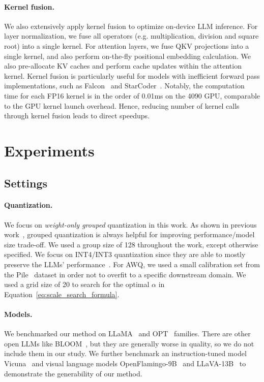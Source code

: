 \paragraph{Kernel fusion.} We also extensively apply kernel fusion to optimize on-device LLM inference. For layer normalization, we fuse all operators (e.g. multiplication, division and square root) into a single kernel. For attention layers, we fuse QKV projections into a single kernel, and also perform on-the-fly positional embedding calculation. We also pre-allocate KV caches and perform cache updates within the attention kernel. Kernel fusion is particularly useful for models with inefficient forward pass implementations, such as Falcon~\cite{penedo2023refinedweb} and StarCoder~\cite{li2023starcoder}. Notably, the computation time for each FP16 kernel is in the order of 0.01ms on the 4090 GPU, comparable to the GPU kernel launch overhead. Hence, reducing number of kernel calls through kernel fusion leads to direct speedups.

\section{Experiments}

\subsection{Settings}

\paragraph{Quantization. } We focus on \emph{weight-only grouped} quantization in this work. As shown in previous work~\cite{dettmers2022case, frantar2022gptq}, grouped quantization is always helpful for improving performance/model size trade-off. We used a group size of 128 throughout the work, except otherwise specified. We focus on INT4/INT3 quantization since they are able to mostly preserve the LLMs' performance~\cite{dettmers2022case}. For AWQ, we used a small calibration set from the Pile~\cite{gao2020pile} dataset in order not to overfit to a specific downstream domain. We used a grid size of 20 to search for the optimal $\alpha$ in Equation~\ref{eq:scale_search_formula}. 

\paragraph{Models. } We benchmarked our method on LLaMA~\cite{touvron2023llama} and OPT~\cite{opt} families. There are other open LLMs like BLOOM~\cite{scao2022bloom}, but they are generally worse in quality, so we do not include them in our study. We further benchmark an instruction-tuned model Vicuna~\cite{vicuna2023} and visual language models OpenFlamingo-9B~\cite{openflamingo} and LLaVA-13B~\cite{liu2023llava} to demonstrate the generability of our method. 

